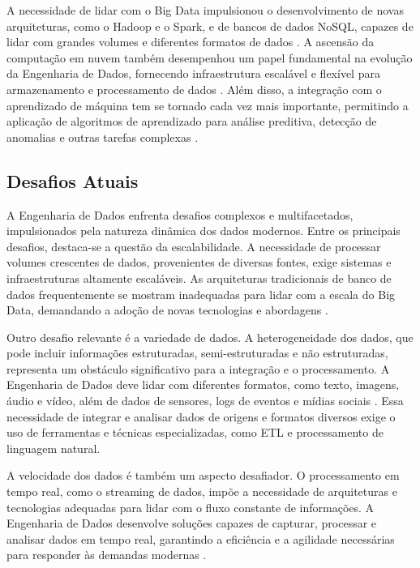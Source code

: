 A necessidade de lidar com o Big Data impulsionou 
o desenvolvimento de novas arquiteturas, como o Hadoop e o Spark, e de bancos de dados NoSQL, capazes de lidar com grandes volumes 
e diferentes formatos de dados \cite{volk2019challenging}. A ascensão da computação em nuvem também desempenhou um papel fundamental na evolução da Engenharia 
de Dados, fornecendo infraestrutura escalável e flexível para armazenamento e processamento de dados \cite{katal2013big}. Além disso, a integração com 
o aprendizado de máquina tem se tornado cada vez mais importante, permitindo a aplicação de algoritmos de aprendizado para análise 
preditiva, detecção de anomalias e outras tarefas complexas \cite{lheureux2017machine}.

\subsection{Desafios Atuais}

A Engenharia de Dados enfrenta desafios complexos e multifacetados, impulsionados pela natureza dinâmica 
dos dados modernos. Entre os principais desafios, destaca-se a questão da escalabilidade. A necessidade de 
processar volumes crescentes de dados, provenientes de diversas fontes, exige sistemas e infraestruturas 
altamente escaláveis. As arquiteturas tradicionais de banco de dados frequentemente se mostram inadequadas 
para lidar com a escala do Big Data, demandando a adoção de novas tecnologias e abordagens \cite{katal2013big}.

Outro desafio relevante é a variedade de dados. A heterogeneidade dos dados, que pode incluir informações 
estruturadas, semi-estruturadas e não estruturadas, representa um obstáculo significativo para a integração 
e o processamento. A Engenharia de Dados deve lidar com diferentes formatos, como texto, imagens, áudio e 
vídeo, além de dados de sensores, logs de eventos e mídias sociais \cite{volk2019challenging}. Essa necessidade de integrar e analisar 
dados de origens e formatos diversos exige o uso de ferramentas e técnicas especializadas, como ETL e 
processamento de linguagem natural.

A velocidade dos dados é também um aspecto desafiador. O processamento em tempo real, como o streaming de dados, 
impõe a necessidade de arquiteturas e tecnologias adequadas para lidar com o fluxo constante de informações. 
A Engenharia de Dados desenvolve soluções capazes de capturar, processar 
e analisar dados em tempo real, garantindo a eficiência e a agilidade necessárias para responder às demandas modernas \cite{lheureux2017machine}.

